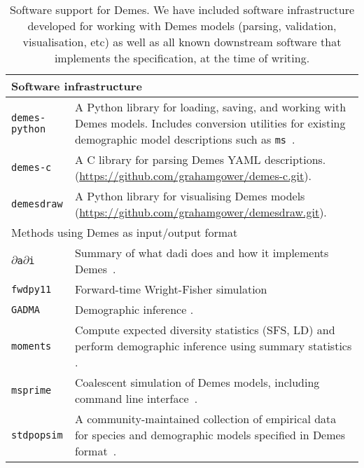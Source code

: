\documentclass[11pt]{article}
\newcommand{\msprime}[0]{\texttt{msprime}}
\newcommand{\stdpopsim}[0]{\texttt{stdpopsim}}
\newcommand{\moments}[0]{\texttt{moments}}
\newcommand{\dadi}[0]{\texttt{$\partial$a$\partial$i}}
\newcommand{\fwdpy}[0]{\texttt{fwdpy11}}
\newcommand{\gadma}[0]{\texttt{GADMA}}
\begin{document}
\renewcommand{\arraystretch}{1.5}
\begin{table}
\begin{center}
\begin{tabular}{lp{12cm}}
\toprule
\multicolumn{2}{l}{Software infrastructure}\\
\midrule
\texttt{demes-python} &
    A Python library for loading, saving, and working with
    Demes models. Includes conversion utilities for existing
    demographic model descriptions such as
    \texttt{ms}~\citep{hudson2002generating}.\\

\texttt{demes-c} &
    A C library for parsing Demes YAML descriptions.
    (\url{https://github.com/grahamgower/demes-c.git}). \\

\texttt{demesdraw} &
    A Python library for visualising Demes models
    (\url{https://github.com/grahamgower/demesdraw.git}). \\

\midrule
\multicolumn{2}{l}{Methods using Demes as input/output format}\\
\midrule


\dadi &
    Summary of what dadi does and how it implements Demes~\citep{gutenkunst2009inferring}.
    \\

\fwdpy &
    Forward-time Wright-Fisher simulation \citep{thornton2014cpp}\\

\gadma &
    Demographic inference \citep{noskova2020gadma}.\\

\moments &
    Compute expected diversity statistics (SFS, LD) and perform
    demographic inference using summary statistics
    \citep{jouganous2017inferring,ragsdale2019models}.\\

\msprime &
    Coalescent simulation of Demes models, including command line
    interface~\citep{kelleher2016efficient,kelleher2020coalescent}.\\

\stdpopsim &
    A community-maintained collection of empirical data for species
    and demographic models specified in Demes
    format~\citep{adrion2020community}.\\

\bottomrule
\end{tabular}
\end{center}
\caption{\label{tab-software}
Software support for Demes. We have included software infrastructure developed
for working with Demes models (parsing, validation, visualisation, etc)
as well as all known downstream software that implements the specification,
at the time of writing.}
\end{table}
\end{document}
